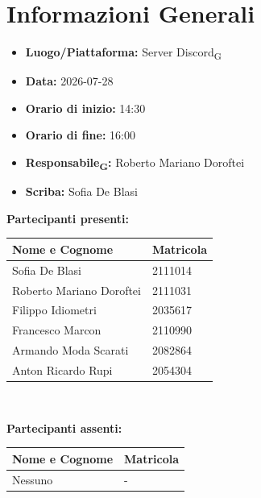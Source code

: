 \section{Informazioni Generali}
\begin{itemize}
	\item \textbf{Luogo/Piattaforma:} Server Discord\textsubscript{G}
	\item \textbf{Data:} 2026-07-28
	\item \textbf{Orario di inizio:} 14:30
	\item \textbf{Orario di fine:} 16:00
	\item \textbf{Responsabile\textsubscript{G}:} Roberto Mariano Doroftei
	\item \textbf{Scriba:} Sofia De Blasi
\end{itemize}

\vspace{0.5cm}
\textbf{Partecipanti presenti:}
\begin{table}[ht]
	\centering
	\renewcommand{\arraystretch}{1.2}
	\begin{tabularx}{\textwidth}{X l}
		\toprule
		\textbf{Nome e Cognome} & \textbf{Matricola} \\
		\midrule
		Sofia De Blasi & 2111014 \\
		Roberto Mariano Doroftei & 2111031 \\
		Filippo Idiometri & 2035617 \\
		Francesco Marcon & 2110990 \\
		Armando Moda Scarati & 2082864 \\
		Anton Ricardo Rupi & 2054304 \\
		\bottomrule
	\end{tabularx}
\\ \end{table}

\vspace{0.5cm}
\textbf{Partecipanti assenti:}
\begin{table}[ht]
	\centering
	\renewcommand{\arraystretch}{1.2}
	\begin{tabularx}{\textwidth}{X l}
		\toprule
		\textbf{Nome e Cognome} & \textbf{Matricola} \\
		\midrule
		Nessuno & - \\
		\bottomrule
	\end{tabularx}
\end{table}

